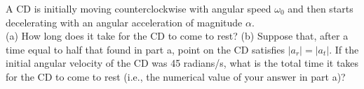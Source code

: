 A CD is initially moving counterclockwise with angular speed $\omega_0$ and then starts
decelerating with an angular acceleration of magnitude $\alpha$.\\
%
(a) How long does it take for the CD to come to rest?\answercheck\hwendpart
%
(b) Suppose that, after a time equal to half that found in part a,
point on the CD satisfies $|a_r|=|a_t|$.
If the initial angular velocity of the CD was 45 radians/s, what is the
total time it takes for the CD to come to rest (i.e., the numerical
value of your answer in part a)?\answercheck
